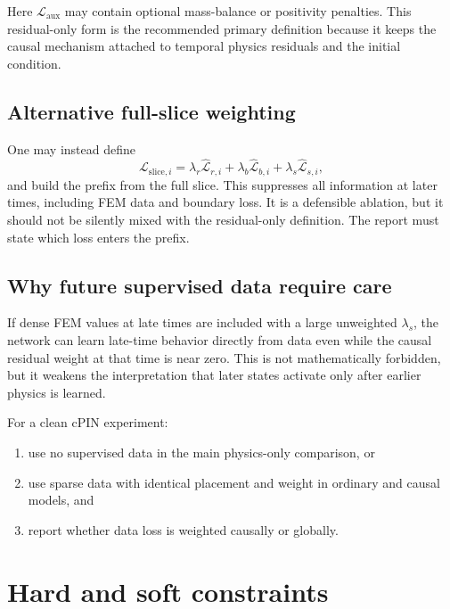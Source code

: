 \documentclass[11pt]{article}
\begin{document}
Here $\mathcal{L}_{\mathrm{aux}}$ may contain optional mass-balance or positivity penalties. This residual-only form is the recommended primary definition because it keeps the causal mechanism attached to temporal physics residuals and the initial condition.

\subsection{Alternative full-slice weighting}

One may instead define
\begin{equation}
\mathcal{L}_{\mathrm{slice},i}
=
\lambda_r\widehat{\mathcal{L}}_{r,i}
+\lambda_b\widehat{\mathcal{L}}_{b,i}
+\lambda_s\widehat{\mathcal{L}}_{s,i},
\end{equation}
and build the prefix from the full slice. This suppresses all information at later times, including FEM data and boundary loss. It is a defensible ablation, but it should not be silently mixed with the residual-only definition. The report must state which loss enters the prefix.

\subsection{Why future supervised data require care}

If dense FEM values at late times are included with a large unweighted $\lambda_s$, the network can learn late-time behavior directly from data even while the causal residual weight at that time is near zero. This is not mathematically forbidden, but it weakens the interpretation that later states activate only after earlier physics is learned.

For a clean cPIN experiment:
\begin{enumerate}[label=\arabic*.]
    \item use no supervised data in the main physics-only comparison, or
    \item use sparse data with identical placement and weight in ordinary and causal models, and
    \item report whether data loss is weighted causally or globally.
\end{enumerate}

\section{Hard and soft constraints}
\label{sec:hard_constraints}
\end{document}
